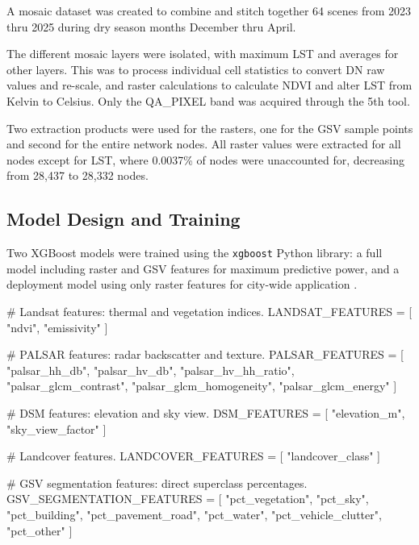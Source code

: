 \documentclass[
]{article}
\newenvironment{Shaded}{\begin{snugshade}}{\end{snugshade}}
\newcommand{\CommentTok}[1]{\textcolor[rgb]{0.37,0.37,0.37}{#1}}
\newcommand{\NormalTok}[1]{\textcolor[rgb]{0.00,0.23,0.31}{#1}}
\newcommand{\OperatorTok}[1]{\textcolor[rgb]{0.37,0.37,0.37}{#1}}
\newcommand{\StringTok}[1]{\textcolor[rgb]{0.13,0.47,0.30}{#1}}
\begin{document}
A mosaic dataset was created to combine and stitch together 64 scenes from 2023 thru 2025 during dry season months December thru April.

The different mosaic layers were isolated, with maximum LST and averages for other layers. This was to process individual cell statistics to convert DN raw values and re-scale, and raster calculations to calculate NDVI and alter LST from Kelvin to Celsius. Only the QA\_PIXEL band was acquired through the 5th tool.

Two extraction products were used for the rasters, one for the GSV sample points and second for the entire network nodes. All raster values were extracted for all nodes except for LST, where 0.0037\% of nodes were unaccounted for, decreasing from 28,437 to 28,332 nodes.

\subsection{Model Design and Training}
\label{subsec:model-design}

Two XGBoost models were trained using the \texttt{xgboost} Python library: a full model including raster and GSV features for maximum predictive power, and a deployment model using only raster features for city-wide application \citep{chen2016}.

\begin{Shaded}
\begin{Highlighting}[]
\CommentTok{\# Landsat features: thermal and vegetation indices.}
\NormalTok{LANDSAT\_FEATURES }\OperatorTok{=}\NormalTok{ [}
    \StringTok{"ndvi"}\NormalTok{,}
    \StringTok{"emissivity"}
\NormalTok{]}

\CommentTok{\# PALSAR features: radar backscatter and texture.}
\NormalTok{PALSAR\_FEATURES }\OperatorTok{=}\NormalTok{ [}
    \StringTok{"palsar\_hh\_db"}\NormalTok{,}
    \StringTok{"palsar\_hv\_db"}\NormalTok{,}
    \StringTok{"palsar\_hv\_hh\_ratio"}\NormalTok{,}
    \StringTok{"palsar\_glcm\_contrast"}\NormalTok{,}
    \StringTok{"palsar\_glcm\_homogeneity"}\NormalTok{,}
    \StringTok{"palsar\_glcm\_energy"}
\NormalTok{]}

\CommentTok{\# DSM features: elevation and sky view.}
\NormalTok{DSM\_FEATURES }\OperatorTok{=}\NormalTok{ [}
    \StringTok{"elevation\_m"}\NormalTok{,}
    \StringTok{"sky\_view\_factor"}
\NormalTok{]}

\CommentTok{\# Landcover features.}
\NormalTok{LANDCOVER\_FEATURES }\OperatorTok{=}\NormalTok{ [}
    \StringTok{"landcover\_class"}
\NormalTok{]}

\CommentTok{\# GSV segmentation features: direct superclass percentages.}
\NormalTok{GSV\_SEGMENTATION\_FEATURES }\OperatorTok{=}\NormalTok{ [}
    \StringTok{"pct\_vegetation"}\NormalTok{,}
    \StringTok{"pct\_sky"}\NormalTok{,}
    \StringTok{"pct\_building"}\NormalTok{,}
    \StringTok{"pct\_pavement\_road"}\NormalTok{,}
    \StringTok{"pct\_water"}\NormalTok{,}
    \StringTok{"pct\_vehicle\_clutter"}\NormalTok{,}
    \StringTok{"pct\_other"}
\NormalTok{]}
\end{Highlighting}
\end{Shaded}
\end{document}
